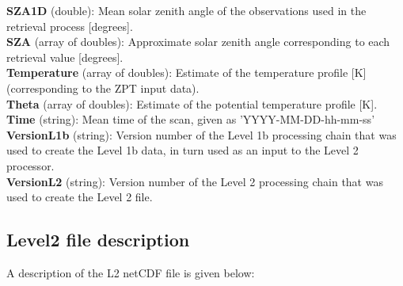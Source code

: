 \textbf{SZA1D} (double): Mean solar zenith angle of the observations used in the retrieval process [degrees]. \\

\textbf{SZA} (array of doubles): Approximate solar zenith angle corresponding to each retrieval value [degrees]. \\ %

\textbf{Temperature} (array of doubles): Estimate of the temperature profile [K] (corresponding to the ZPT input data). \\ %

\textbf{Theta} (array of doubles): Estimate of the potential temperature profile [K]. \\

\textbf{Time} (string): Mean time of the scan, given as 'YYYY-MM-DD-hh-mm-ss' \\ %

\textbf{VersionL1b} (string): Version number of the Level 1b processing chain that was used to create the Level 1b data, in turn used as an input to the Level 2 processor. \\

\textbf{VersionL2} (string): Version number of the Level 2 processing chain that was used to create the Level 2 file. \\


\subsection{Level2 file description}

A description of the L2 netCDF file is given below:

